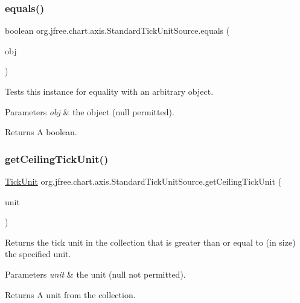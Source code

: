\subsubsection{\texorpdfstring{equals()}{equals()}}
{\footnotesize\ttfamily boolean org.\+jfree.\+chart.\+axis.\+Standard\+Tick\+Unit\+Source.\+equals (\begin{DoxyParamCaption}\item[{Object}]{obj }\end{DoxyParamCaption})}

Tests this instance for equality with an arbitrary object.


\begin{DoxyParams}{Parameters}
{\em obj} & the object ({\ttfamily null} permitted).\\
\hline
\end{DoxyParams}
\begin{DoxyReturn}{Returns}
A boolean. 
\end{DoxyReturn}
\mbox{\label{classorg_1_1jfree_1_1chart_1_1axis_1_1_standard_tick_unit_source_a3b8cc0c89ecd3bf00acbd1368a571190}} 
\subsubsection{\texorpdfstring{get\+Ceiling\+Tick\+Unit()}{getCeilingTickUnit()}\hspace{0.1cm}{\footnotesize\ttfamily [1/2]}}
{\footnotesize\ttfamily \mbox{\hyperlink{classorg_1_1jfree_1_1chart_1_1axis_1_1_tick_unit}{Tick\+Unit}} org.\+jfree.\+chart.\+axis.\+Standard\+Tick\+Unit\+Source.\+get\+Ceiling\+Tick\+Unit (\begin{DoxyParamCaption}\item[{\mbox{\hyperlink{classorg_1_1jfree_1_1chart_1_1axis_1_1_tick_unit}{Tick\+Unit}}}]{unit }\end{DoxyParamCaption})}

Returns the tick unit in the collection that is greater than or equal to (in size) the specified unit.


\begin{DoxyParams}{Parameters}
{\em unit} & the unit ({\ttfamily null} not permitted).\\
\hline
\end{DoxyParams}
\begin{DoxyReturn}{Returns}
A unit from the collection. 
\end{DoxyReturn}


